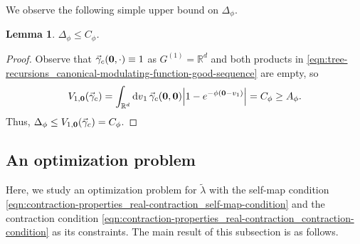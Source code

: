 \documentclass[11pt]{article}
\newcommand{\R}{\mathbb R}
\newcommand{\pwcc}{\Delta_{\phi}}
\newcommand{\tl}{\tilde{\lambda}}
\newcommand{\aconst}{A_{\phi}}
\numberwithin{equation}{section}
\theoremstyle{plain}
\newtheorem{lemma}[theorem]{Lemma}
\theoremstyle{definition}
\theoremstyle{remark}
\begin{document}
We observe the following simple upper bound on $\pwcc$.

\begin{lemma}
\label{lem:contraction-properties_real-contraction_pwcc-upper-bound}
$\pwcc\le C_{\phi}$.
\end{lemma}

\begin{proof}
Observe that $\vec{\gamma}_{c}(\vb{0},\cdot)\equiv 1$ as $G^{(1)}=\R^{d}$ and both products in \eqref{eqn:tree-recursions_canonical-modulating-function-good-sequence} are empty, so 
\begin{equation}
V_{1,\vb{0}}(\vec{\gamma}_{c})=\int_{\R^{d}}\dd{v}_{1}\vec{\gamma}_{c}(\vb{0},\vb{0})\abs{1-e^{-\phi(\vb{0}-v_{1})}}=C_{\phi}\ge\aconst.
\end{equation}
Thus, $\pwcc\le V_{1,\vb{0}}(\vec{\gamma}_{c})=C_{\phi}$.
\end{proof}



\subsection{An optimization problem}
\label{sec:contraction-properties_optimization-problem}

Here, we study an optimization problem for $\tl$ with the self-map condition \eqref{eqn:contraction-properties_real-contraction_self-map-condition} and the contraction condition \eqref{eqn:contraction-properties_real-contraction_contraction-condition} as its constraints.
The main result of this subsection is as follows.
\end{document}
